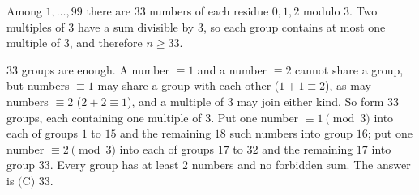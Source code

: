 Among $1,\dots,99$ there are $33$ numbers of each residue $0,1,2$ modulo $3$. Two multiples of $3$ have a sum divisible by $3$, so each group contains at most one multiple of $3$, and therefore $n\ge33$.

$33$ groups are enough. A number $\equiv1$ and a number $\equiv2$ cannot share a group, but numbers $\equiv1$ may share a group with each other ($1+1\equiv2$), as may numbers $\equiv2$ ($2+2\equiv1$), and a multiple of $3$ may join either kind. So form $33$ groups, each containing one multiple of $3$. Put one number $\equiv1\pmod3$ into each of groups $1$ to $15$ and the remaining $18$ such numbers into group $16$; put one number $\equiv2\pmod3$ into each of groups $17$ to $32$ and the remaining $17$ into group $33$. Every group has at least $2$ numbers and no forbidden sum. The answer is $\boxed{\text{(C) } 33}$.
